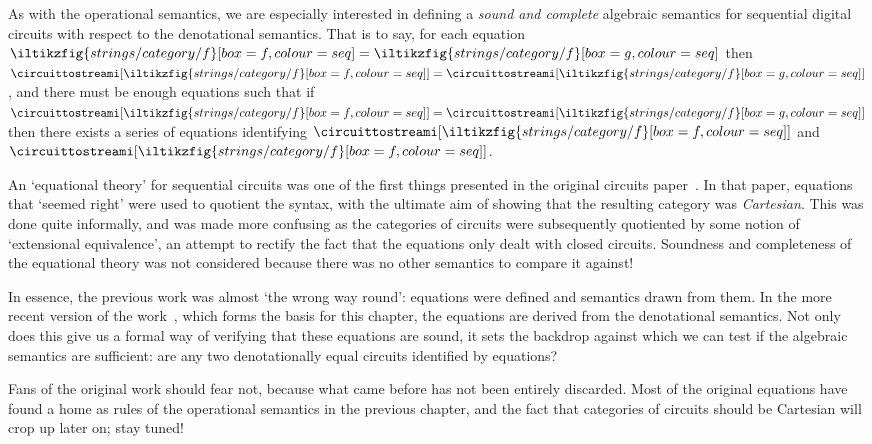 As with the operational semantics, we are especially interested in defining a
\emph{sound and complete} algebraic semantics for sequential digital circuits
with respect to the denotational semantics.
That is to say, for each equation \(
\iltikzfig{strings/category/f}[box=f,colour=seq]
=
\iltikzfig{strings/category/f}[box=g,colour=seq]
\) then \(
\circuittostreami[\iltikzfig{strings/category/f}[box=f,colour=seq]]
=
\circuittostreami[\iltikzfig{strings/category/f}[box=g,colour=seq]]
\), and there must be enough equations such that if \(
\circuittostreami[\iltikzfig{strings/category/f}[box=f,colour=seq]]
=
\circuittostreami[\iltikzfig{strings/category/f}[box=g,colour=seq]]
\) then there exists a series of equations identifying \(
\circuittostreami[\iltikzfig{strings/category/f}[box=f,colour=seq]]
\) and \(
\circuittostreami[\iltikzfig{strings/category/f}[box=f,colour=seq]]
\).

\begin{remark}
    An `equational theory' for sequential circuits was one of the first things
    presented in the original circuits
    paper~\cite{ghica2016categorical,ghica2017diagrammatic}.
    In that paper, equations that `seemed right' were used to quotient the
    syntax, with the ultimate aim of showing that the resulting category was
    \emph{Cartesian}.
    This was done quite informally, and was made more confusing as
    the categories of circuits were subsequently quotiented by some notion of
    `extensional equivalence', an attempt to rectify the fact that the
    equations only dealt with closed circuits.
    Soundness and completeness of the equational theory was not considered
    because there was no other semantics to compare it against!

    In essence, the previous work was almost `the wrong way round': equations
    were defined and semantics drawn from them.
    In the more recent version of the work~\cite[Sec. 5]{ghica2024fully}, which
    forms the basis for this chapter, the equations are derived from the
    denotational semantics.
    Not only does this give us a formal way of verifying that these equations
    are sound, it sets the backdrop against which we can test if the algebraic
    semantics are sufficient: are any two denotationally equal circuits
    identified by equations?

    Fans of the original work should fear not, because what came before has not
    been entirely discarded.
    Most of the original equations have found a home as rules of the operational
    semantics in the previous chapter, and the fact that categories of circuits
    should be Cartesian will crop up later on; stay tuned!
\end{remark}

